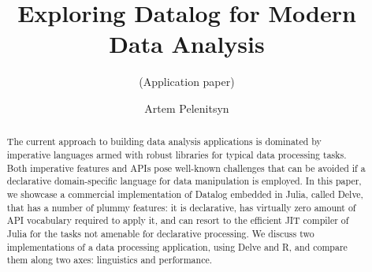 \documentclass[runningheads]{llncs}
\begin{document}
%
\title{Exploring Datalog for Modern Data Analysis}
\subtitle{(Application paper)}
%
%
\author{%
Artem Pelenitsyn%
}
%
%
%
\maketitle              %
%
\begin{abstract}
The current approach to building data analysis applications is dominated by
imperative languages armed with robust libraries for typical data processing
tasks. Both imperative features and APIs pose well-known challenges that can
be avoided if a declarative domain-specific language for data manipulation is
employed. In this paper, we showcase a commercial implementation of Datalog
embedded in Julia, called Delve, that has a number of plummy features: it is
declarative, has virtually zero amount of API vocabulary required to apply it,
and can resort to the efficient JIT compiler of Julia for the tasks not
amenable for declarative processing. We discuss two implementations of a data
processing application, using Delve and R, and compare them along two axes:
linguistics and performance.



\end{abstract}
%
%
%



%
%
%


%
\end{document}
